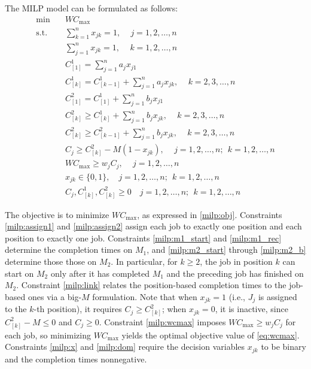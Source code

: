 \documentclass[12pt]{article}
\begin{document}
\begin{sloppypar}
        The MILP model can be formulated as follows:
        \begin{align}
            \min \quad & W C_{\max} \label{milp:obj} \\
            \text{s.t.} \quad & \sum_{k=1}^{n} x_{jk} = 1, \quad \, j = 1, 2,\dots, n \label{milp:assign1} \\
            & \sum_{j=1}^{n} x_{jk} = 1, \quad \, k = 1, 2, \ldots,n \label{milp:assign2} \\
            & C_{[1]}^1 = \sum_{j=1}^{n} a_j x_{j1} \label{milp:m1_start} \\
            & C_{[k]}^1 = C_{[k-1]}^1 + \sum_{j=1}^{n} a_j x_{jk}, \quad \, k = 2, 3, \ldots, n \label{milp:m1_rec} \\
            & C_{[1]}^2 = C_{[1]}^1 + \sum_{j=1}^{n} b_j x_{j1} \label{milp:m2_start} \\
            & C_{[k]}^2 \geq C_{[k]}^1 + \sum_{j=1}^{n} b_j x_{jk}, \quad \, k = 2, 3, \ldots, n \label{milp:m2_a} \\
            & C_{[k]}^2 \geq C_{[k-1]}^2 + \sum_{j=1}^{n} b_j x_{jk}, \quad \, k = 2, 3, \ldots, n \label{milp:m2_b} \\
            & C_j \geq C_{[k]}^2 - M(1 - x_{jk}), \quad \, j = 1, 2, \ldots, n; ~~ k = 1, 2, \ldots, n \label{milp:link} \\
            & W C_{\max} \geq w_j C_j, \quad \, j = 1, 2, \ldots,n \label{milp:wcmax} \\
            & x_{jk} \in \{0, 1\},\quad j=1, 2, \ldots, n; ~~ k=1, 2, \ldots, n \label{milp:x}\\
            & C_j, C_{[k]}^1, C_{[k]}^2 \geq 0 \quad j=1, 2, \ldots, n; ~~ k=1, 2, \ldots, n \label{milp:dom}
        \end{align}
        
        The objective is to minimize $W C_{\max}$, as expressed in \cref{milp:obj}. Constraints \cref{milp:assign1} and \cref{milp:assign2} assign each job to exactly one position and each position to exactly one job. Constraints \cref{milp:m1_start} and \cref{milp:m1_rec} determine the completion times on $M_1$, and \cref{milp:m2_start} through \cref{milp:m2_b} determine those those on $M_2$. In particular, for $k \geq 2$, the job in position $k$ can start on $M_2$ only after it has completed $M_1$ and the preceding job has finished on $M_2$. Constraint \cref{milp:link} relates the position-based completion times to the job-based ones via a big-$M$ formulation. Note that when $x_{jk} = 1$ (i.e., $J_j$ is assigned to the $k$-th position), it requires $C_j \geq C_{[k]}^2$; when $x_{jk} = 0$, it is inactive, since $C_{[k]}^2 - M \leq 0$ and $C_j \geq 0$. Constraint \cref{milp:wcmax} imposes  $W C_{\max} \geq w_j C_j$ for each job, so minimizing $W C_{\max}$ yields the optimal objective value of \cref{eq:wcmax}. Constraints \cref{milp:x} and \cref{milp:dom} require the decision variables $x_{jk}$ to be binary and the completion times nonnegative.
        

\end{sloppypar}
\end{document}
